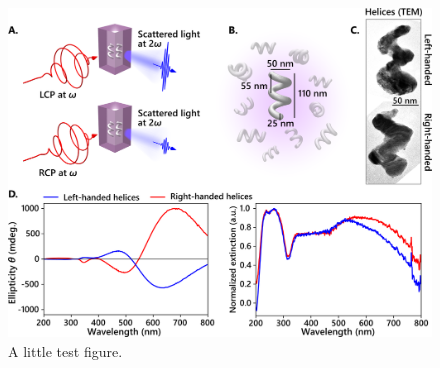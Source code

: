 \begin{figure}[htb!]
    \centering
    \includegraphics[scale=0.8]{./figures/test_fig_1.png}
    \caption{\label{fig:test_include:test_figure}A little test figure.}
\end{figure}